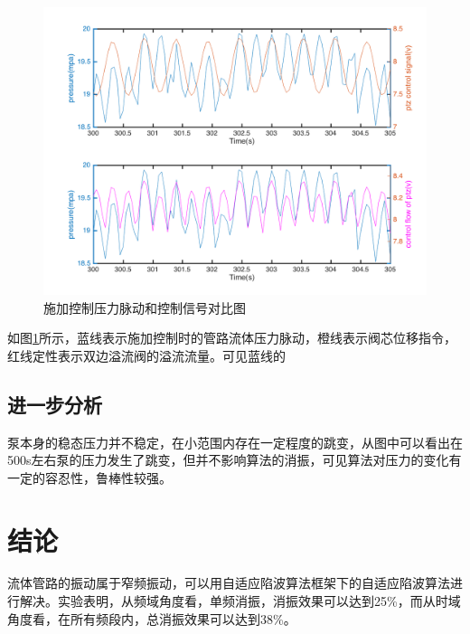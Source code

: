 \documentclass[12pt]{article}
\begin{document}
\begin{figure}[H]
\begin{center}
\includegraphics[width=0.9\linewidth]{./images/difference_in_plase_between_controlsignal_and_pressure.png}
\caption{施加控制压力脉动和控制信号对比图}
\label{fig:fig14}
\end{center}
\end{figure}

如图\ref{fig:fig14}所示，蓝线表示施加控制时的管路流体压力脉动，橙线表示阀芯位移指令，红线定性表示双边溢流阀的溢流流量。可见蓝线的
\subsection{进一步分析}
泵本身的稳态压力并不稳定，在小范围内存在一定程度的跳变，从图中可以看出在500s左右泵的压力发生了跳变，但并不影响算法的消振，可见算法对压力的变化有一定的容忍性，鲁棒性较强。

\section{结论}
流体管路的振动属于窄频振动，可以用自适应陷波算法框架下的自适应陷波算法进行解决。实验表明，从频域角度看，单频消振，消振效果可以达到25\%，而从时域角度看，在所有频段内，总消振效果可以达到38\%。
\end{document}
